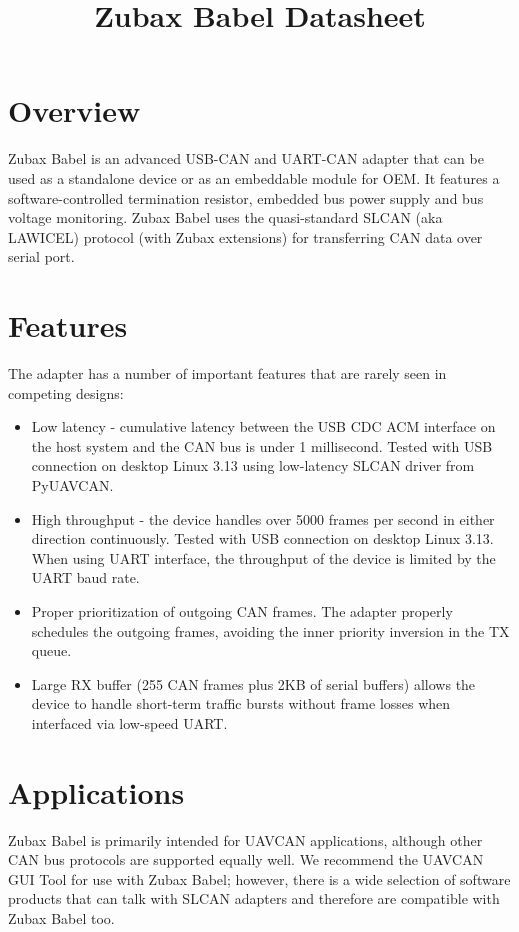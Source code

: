 \documentclass{zubaxdoc}
\title{Zubax Babel Datasheet}
\begin{document}
\frontmatter
\begin{titlepage}
\section*{Overview}
Zubax Babel is an advanced USB-CAN and UART-CAN adapter that can be used as a standalone device or as an embeddable module for OEM. It features a software-controlled termination resistor, embedded bus power supply and bus voltage monitoring. Zubax Babel uses the quasi-standard SLCAN (aka LAWICEL) protocol (with Zubax extensions) for transferring CAN data over serial port.

\section*{Features}

The adapter has a number of important features that are rarely seen in competing designs:
\begin{itemize}
\item Low latency - cumulative latency between the USB CDC ACM interface on the host system and the CAN bus is under 1 millisecond. Tested with USB connection on desktop Linux 3.13 using low-latency SLCAN driver from PyUAVCAN.
\item High throughput - the device handles over 5000 frames per second in either direction continuously. Tested with USB connection on desktop Linux 3.13. When using UART interface, the throughput of the device is limited by the UART baud rate.
\item Proper prioritization of outgoing CAN frames. The adapter properly schedules the outgoing frames, avoiding the inner priority inversion in the TX queue.
\item Large RX buffer (255 CAN frames plus 2KB of serial buffers) allows the device to handle short-term traffic bursts without frame losses when interfaced via low-speed UART.
\end{itemize}

\BeginRightColumn

\section*{Applications}

Zubax Babel is primarily intended for UAVCAN applications, although other CAN bus protocols are supported equally well. We recommend the UAVCAN GUI Tool for use with Zubax Babel; however, there is a wide selection of software products that can talk with SLCAN adapters and therefore are compatible with Zubax Babel too.


\end{titlepage}
\end{document}
